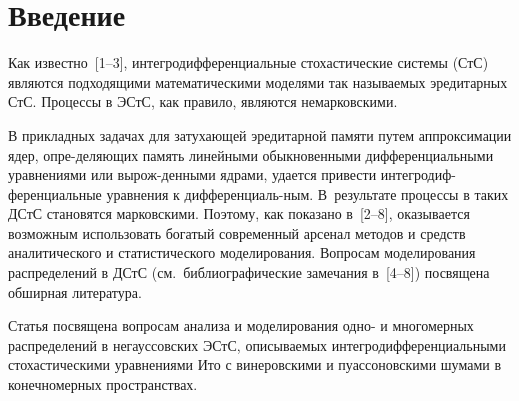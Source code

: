 \vspace*{2pt}


\vspace*{2pt}




      \thispagestyle{headings}

      \begin{multicols}{2}

            \label{st\stat}   

\section{Введение}

Как известно~[1--3], интегродифференциальные стохастические системы (СтС) 
являются подходящими математическими моделями так называемых эредитарных СтС. 
Процессы в ЭСтС, как правило, являются немарковскими.

В прикладных задачах для затухающей эредитарной памяти путем аппроксимации ядер, 
опре-\linebreak деляющих память линейными обыкновенными дифференциальными уравнениями или 
вырож-\linebreak денными ядрами, удается привести интегродиф-\linebreak ференциальные 
уравнения к дифференциаль-\linebreak ным. 
В~результате процессы в таких ДСтС становятся марковскими. 
Поэтому, как показано в~[2--8], оказывается возможным использовать богатый современный 
арсенал методов и средств аналитического и статистического моделирования.
%
Вопросам  моделирования распределений  в ДСтС (см.\ библиографические замечания в~[4--8]) 
посвящена обширная ли\-те\-ра\-тура.
{

}

Статья посвящена вопросам анализа и моделирования одно- и многомерных распределений 
в негауссовских ЭСтС, описываемых интегродифференциальными стохастическими уравнениями 
Ито с винеровскими и пуассоновскими шумами в конечномерных пространствах.



\end{multicols}
